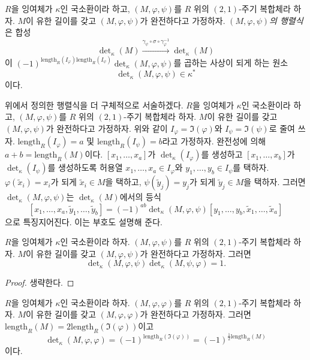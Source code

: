 \begin{definition}
\label{definition-periodic-determinant}
$R$을 잉여체가 $\kappa$인 국소환이라 하고, $(M, \varphi, \psi)$를
$R$ 위의 $(2, 1)$-주기 복합체라 하자. $M$이 유한 길이를 갖고
$(M, \varphi, \psi)$가 완전하다고 가정하자.
{\it $(M, \varphi, \psi)$의 행렬식}은 합성
$$
\det\nolimits_\kappa(M)
\xrightarrow{\gamma_\psi \circ \sigma \circ \gamma_\varphi^{-1}}
\det\nolimits_\kappa(M)
$$
이
$(-1)^{\text{length}_R(I_\varphi)\text{length}_R(I_\psi)}
\det\nolimits_\kappa(M, \varphi, \psi)$를 곱하는 사상이 되게 하는 원소
$$
\det\nolimits_\kappa(M, \varphi, \psi) \in \kappa^*
$$
이다.
\end{definition}

\begin{remark}
\label{remark-more-elementary}
위에서 정의한 행렬식을 더 구체적으로 서술하겠다. $R$을 잉여체가
$\kappa$인 국소환이라 하고, $(M, \varphi, \psi)$를 $R$ 위의
$(2, 1)$-주기 복합체라 하자. $M$이 유한 길이를 갖고
$(M, \varphi, \psi)$가 완전하다고 가정하자. 위와 같이
$I_\varphi = \Im(\varphi)$와 $I_\psi = \Im(\psi)$로 줄여 쓰자.
$\text{length}_R(I_\varphi) = a$ 및 $\text{length}_R(I_\psi) = b$라고
가정하자. 완전성에 의해 $a + b = \text{length}_R(M)$이다.
$[x_1, \ldots, x_a]$가 $\det_\kappa(I_\varphi)$를 생성하고
$[x_1, \ldots, x_b]$가 $\det_\kappa(I_\psi)$를 생성하도록 허용열
$x_1, \ldots, x_a \in I_\varphi$와 $y_1, \ldots, y_b \in I_\psi$를
택하자. $\varphi(\tilde x_i) = x_i$가 되게 $\tilde x_i \in M$을 택하고,
$\psi(\tilde y_j) = y_j$가 되게 $\tilde y_j \in M$을 택하자. 그러면
$\det_\kappa(M, \varphi, \psi)$는 $\det_\kappa(M)$에서의 등식
$$
[x_1, \ldots, x_a, \tilde y_1, \ldots, \tilde y_b]
=
(-1)^{ab} \det\nolimits_\kappa(M, \varphi, \psi)
[y_1, \ldots, y_b, \tilde x_1, \ldots, \tilde x_a]
$$
으로 특징지어진다. 이는 부호도 설명해 준다.
\end{remark}

\begin{lemma}
\label{lemma-periodic-determinant-shift}
$R$을 잉여체가 $\kappa$인 국소환이라 하자. $(M, \varphi, \psi)$를
$R$ 위의 $(2, 1)$-주기 복합체라 하자. $M$이 유한 길이를 갖고
$(M, \varphi, \psi)$가 완전하다고 가정하자. 그러면
$$
\det\nolimits_\kappa(M, \varphi, \psi)
\det\nolimits_\kappa(M, \psi, \varphi)
= 1.
$$
\end{lemma}

\begin{proof}
생략한다.
\end{proof}

\begin{lemma}
\label{lemma-periodic-determinant-sign}
$R$을 잉여체가 $\kappa$인 국소환이라 하자. $(M, \varphi, \varphi)$를
$R$ 위의 $(2, 1)$-주기 복합체라 하자. $M$이 유한 길이를 갖고
$(M, \varphi, \varphi)$가 완전하다고 가정하자. 그러면
$\text{length}_R(M) = 2 \text{length}_R(\Im(\varphi))$이고
$$
\det\nolimits_\kappa(M, \varphi, \varphi)
=
(-1)^{\text{length}_R(\Im(\varphi))}
=
(-1)^{\frac{1}{2}\text{length}_R(M)}
$$
이다.
\end{lemma}


